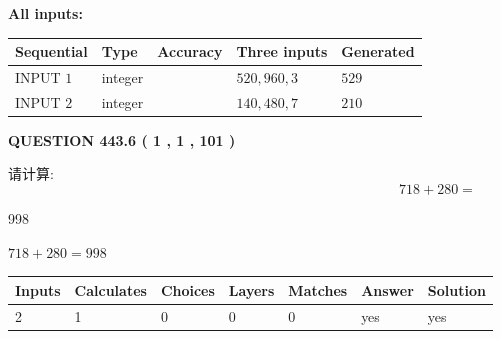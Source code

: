 \documentclass{ctexart}
\begin{document}
   
   
   
\noindent\vspace{0.1in}\hspace{-0.08in} {\textbf{\Large{All inputs: }}}
   
   
  
  
\noindent\begin{tabular}{|l|l|l|l|l|}
\hline
 Sequential & Type & Accuracy & Three inputs & Generated \\ 
\hline
 
 
  INPUT $  1 $ & integer &  & $
 520
 , 
 960
 , 
 3
 $ & $ 529 $ 
 \\  \hline  
 
 
  INPUT $  2 $ & integer &  & $
 140
 , 
 480
 , 
 7
 $ & $ 210 $ 
 \\  \hline  
 \end{tabular}
   
   
  
\vspace{0.2in}
  
{\textbf{\Large{QUESTION
443.6 
 ( 1 , 1 , 101 )
}}}
  
  
 
请计算:
\begin{equation}
718 +  %
280 = \nonumber
\end{equation}
 
 
 
\noindent{}
 
 

998
 
 
\noindent{}
 
 

 
 
 
\noindent{}
 
 

$ %
718 +  %
280=   %
998$
 
 
\noindent{}
 
 

 
   
   
   
   
\noindent\begin{tabular}{|l|l|l|l|l|l|l|}
 \hline
Inputs & Calculates & Choices & Layers & Matches & Answer & Solution \\ \hline
 2  & 
 1  & 
 0
  & 
 0  & 
 0  & 
  yes & 
  yes 
  \\ \hline
 \end{tabular}
   
\end{document}
